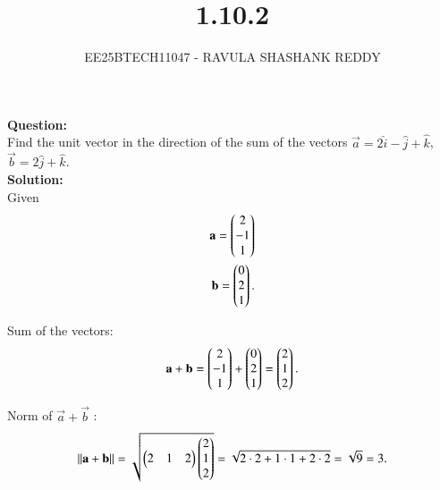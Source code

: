 \documentclass[journal]{article}
\begin{document}
	
	
	\vspace{3cm}
	
\title{1.10.2}
\author{EE25BTECH11047 - RAVULA SHASHANK REDDY}
\maketitle
\hrulefill
\bigskip 

\renewcommand{\thetable}{\theenumi}
\setlength{\intextsep}{10pt}
\textbf{Question:} \\ 

  Find the unit vector in the direction of the sum of the vectors
$\vec{a} = 2\hat{i} - \hat{j} + \hat{k}$, 
$\vec{b} = 2\hat{j} + \hat{k}$.\\


\textbf{Solution:}\\

Given
\begin{align}
\mathbf{a} = \begin{pmatrix} 2 \\ -1 \\ 1 \end{pmatrix}\\ 
\mathbf{b} = \begin{pmatrix} 0 \\ 2 \\ 1 \end{pmatrix}.
\end{align}

Sum of the vectors:
\begin{align}
\mathbf{a}+\mathbf{b} = \begin{pmatrix} 2 \\ -1 \\ 1 \end{pmatrix} + \begin{pmatrix} 0 \\ 2 \\ 1 \end{pmatrix}
= \begin{pmatrix} 2 \\ 1 \\ 2 \end{pmatrix}.
\end{align}

Norm of $\vec{a}+\vec{b}$ :
\begin{align}
\|\mathbf{a}+\mathbf{b}\| = \sqrt{ \begin{pmatrix} 2 & 1 & 2 \end{pmatrix} 
\begin{pmatrix} 2 \\ 1 \\ 2 \end{pmatrix} }
= \sqrt{ 2\cdot 2 + 1\cdot 1 + 2\cdot 2 }
= \sqrt{9} = 3.
\end{align}
\end{document}
